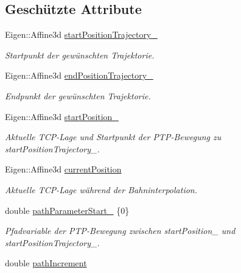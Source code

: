 \subsection*{Geschützte Attribute}
\begin{DoxyCompactItemize}
\item 
Eigen\-::\-Affine3d \hyperlink{classITrajectory_a6884ba58490bcce750b698c2da8bc7bc}{start\-Position\-Trajectory\-\_\-}
\begin{DoxyCompactList}\small\item\em Startpunkt der gewünschten Trajektorie. \end{DoxyCompactList}\item 
Eigen\-::\-Affine3d \hyperlink{classITrajectory_ac49c42b8d8344554edb24d1ae525a64c}{end\-Position\-Trajectory\-\_\-}
\begin{DoxyCompactList}\small\item\em Endpunkt der gewünschten Trajektorie. \end{DoxyCompactList}\item 
Eigen\-::\-Affine3d \hyperlink{classITrajectory_a4fe5238f588ac3ed157bebf0dd7d45f5}{start\-Position\-\_\-}
\begin{DoxyCompactList}\small\item\em Aktuelle T\-C\-P-\/\-Lage und Startpunkt der P\-T\-P-\/\-Bewegung zu start\-Position\-Trajectory\-\_\-. \end{DoxyCompactList}\item 
Eigen\-::\-Affine3d \hyperlink{classITrajectory_ad0e7c293d6f0940523a158d4f898d366}{current\-Position}
\begin{DoxyCompactList}\small\item\em Aktuelle T\-C\-P-\/\-Lage während der Bahninterpolation. \end{DoxyCompactList}\item 
\hypertarget{classITrajectory_abd771a6cdd78a0a5bc188450c14057ff}{double \hyperlink{classITrajectory_abd771a6cdd78a0a5bc188450c14057ff}{path\-Parameter\-Start\-\_\-} \{0\}}\label{classITrajectory_abd771a6cdd78a0a5bc188450c14057ff}

\begin{DoxyCompactList}\small\item\em Pfadvariable der P\-T\-P-\/\-Bewegung zwischen start\-Position\-\_\- und start\-Position\-Trajectory\-\_\-. \end{DoxyCompactList}\item 
\hypertarget{classITrajectory_afa79f45c835319a41977e68cd711929c}{double \hyperlink{classITrajectory_afa79f45c835319a41977e68cd711929c}{path\-Increment}}\label{classITrajectory_afa79f45c835319a41977e68cd711929c}


\end{DoxyCompactItemize}
